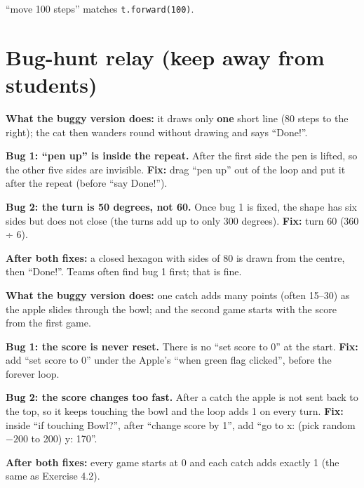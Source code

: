 \begin{answer}
\enquote{move 100 steps} matches \texttt{t.forward(100)}.
\end{answer}

\section{Bug-hunt relay (keep away from students)}
\begin{answer}
\textbf{What the buggy version does:} it draws only \textbf{one} short line (80 steps to the right); the cat then wanders round without drawing and says \enquote{Done!}.

\textbf{Bug 1: \enquote{pen up} is inside the repeat.} After the first side the pen is lifted, so the other five sides are invisible. \textbf{Fix:} drag \enquote{pen up} out of the loop and put it after the repeat (before \enquote{say Done!}).

\textbf{Bug 2: the turn is 50 degrees, not 60.} Once bug 1 is fixed, the shape has six sides but does not close (the turns add up to only 300 degrees). \textbf{Fix:} turn 60 (360 ÷ 6).

\textbf{After both fixes:} a closed hexagon with sides of 80 is drawn from the centre, then \enquote{Done!}. Teams often find bug 1 first; that is fine.
\end{answer}

\begin{answer}
\textbf{What the buggy version does:} one catch adds many points (often 15--30) as the apple slides through the bowl; and the second game starts with the score from the first game.

\textbf{Bug 1: the score is never reset.} There is no \enquote{set score to 0} at the start. \textbf{Fix:} add \enquote{set score to 0} under the Apple's \enquote{when green flag clicked}, before the forever loop.

\textbf{Bug 2: the score changes too fast.} After a catch the apple is not sent back to the top, so it keeps touching the bowl and the loop adds 1 on every turn. \textbf{Fix:} inside \enquote{if touching Bowl?}, after \enquote{change score by 1}, add \enquote{go to x: (pick random $-200$ to 200) y: 170}.

\textbf{After both fixes:} every game starts at 0 and each catch adds exactly 1 (the same as Exercise 4.2).
\end{answer}

